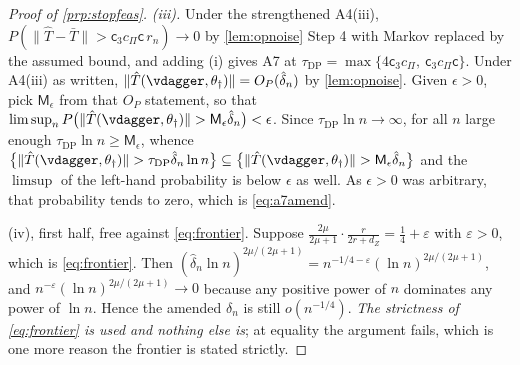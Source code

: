\begin{proof}[Proof of \cref{prp:stopfeas}]
\emph{(iii).} Under the strengthened A4(iii), $P(\|\hat T-\bar T\|>\mathsf c_3c_\Pi\mathsf c\,r_n)\to0$
by \cref{lem:opnoise} Step 4 with Markov replaced by the assumed bound, and adding (i) gives A7 at
$\tau_{\mathrm{DP}}=\max\{4\mathsf c_3c_\Pi,\ \mathsf c_3c_\Pi\mathsf c\}$. Under A4(iii) as written,
$\|\hat T(\vdagger,\theta_\dagger)\|=O_P(\hat\delta_n)$ by \cref{lem:opnoise}. Given $\epsilon>0$, pick
$\mathsf M_\epsilon$ from that $O_P$ statement, so that
$\limsup_nP\big(\|\hat T(\vdagger,\theta_\dagger)\|>\mathsf M_\epsilon\hat\delta_n\big)<\epsilon$. Since
$\tau_{\mathrm{DP}}\ln n\to\infty$, for all $n$ large enough $\tau_{\mathrm{DP}}\ln n\ge\mathsf M_\epsilon$,
whence
$\big\{\|\hat T(\vdagger,\theta_\dagger)\|>\tau_{\mathrm{DP}}\hat\delta_n\ln n\big\}
\subseteq\big\{\|\hat T(\vdagger,\theta_\dagger)\|>\mathsf M_\epsilon\hat\delta_n\big\}$ and the
$\limsup$ of the left-hand probability is below $\epsilon$ as well. As $\epsilon>0$ was arbitrary, that
probability tends to zero, which is \eqref{eq:a7amend}.

(iv), first half, free against \eqref{eq:frontier}. Suppose
$\tfrac{2\mu}{2\mu+1}\cdot\tfrac{r}{2r+d_Z}=\tfrac14+\varepsilon$ with $\varepsilon>0$, which is
\eqref{eq:frontier}. Then $(\hat\delta_n\ln n)^{2\mu/(2\mu+1)}=n^{-1/4-\varepsilon}(\ln n)^{2\mu/(2\mu+1)}$, and
$n^{-\varepsilon}(\ln n)^{2\mu/(2\mu+1)}\to0$ because any positive power of $n$
dominates any power of $\ln n$. Hence the amended $\delta_n$ is still $o(n^{-1/4})$.
\emph{The strictness of \eqref{eq:frontier} is used and nothing else is}; at equality the argument
fails, which is one more reason the frontier is stated strictly.


\end{proof}
